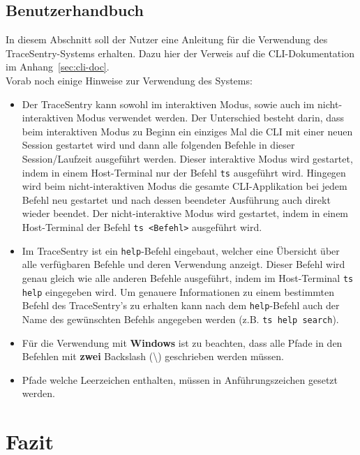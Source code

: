 \documentclass[a4paper,12pt]{report}
\begin{document}
    \clearpage


    \section{Benutzerhandbuch}
    \label{sec:user-manual}
    In diesem Abschnitt soll der Nutzer eine Anleitung für die Verwendung des TraceSentry-Systems erhalten.
    Dazu hier der Verweis auf die CLI-Dokumentation im Anhang~\ref{sec:cli-doc}.
    \\
    Vorab noch einige Hinweise zur Verwendung des Systems:
    \begin{itemize}
        \item Der TraceSentry kann sowohl im interaktiven Modus, sowie auch im nicht-interaktiven Modus verwendet werden.
        Der Unterschied besteht darin, dass beim interaktiven Modus zu Beginn ein einziges Mal die CLI mit einer neuen Session gestartet wird und
        dann alle folgenden Befehle in dieser Session/Laufzeit ausgeführt werden.
        Dieser interaktive Modus wird gestartet, indem in einem Host-Terminal nur der Befehl \texttt{ts} ausgeführt wird.
        Hingegen wird beim nicht-interaktiven Modus die gesamte CLI-Applikation bei jedem Befehl neu gestartet und nach dessen beendeter Ausführung auch direkt wieder beendet.
        Der nicht-interaktive Modus wird gestartet, indem in einem Host-Terminal der Befehl \texttt{ts <Befehl>} ausgeführt wird.
        \item Im TraceSentry ist ein \texttt{help}-Befehl eingebaut, welcher eine Übersicht über alle verfügbaren Befehle und deren Verwendung anzeigt.
        Dieser Befehl wird genau gleich wie alle anderen Befehle ausgeführt, indem im Host-Terminal \texttt{ts help} eingegeben wird.
        Um genauere Informationen zu einem bestimmten Befehl des TraceSentry's zu erhalten kann nach dem \texttt{help}-Befehl auch der Name des gewünschten Befehls angegeben werden (z.B. \texttt{ts help search}).
        \item Für die Verwendung mit \textbf{Windows} ist zu beachten, dass alle Pfade in den Befehlen mit \textbf{zwei} Backslash (\textbackslash) geschrieben werden müssen.
        \item Pfade welche Leerzeichen enthalten, müssen in Anführungszeichen gesetzt werden.
    \end{itemize}


    \chapter{Fazit}
\end{document}
